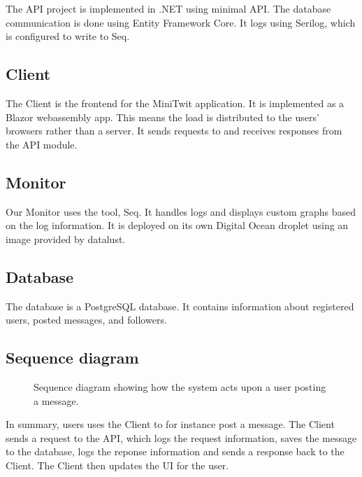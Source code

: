 The API project is implemented in .NET using minimal API.
The database communication is done using Entity Framework Core.
It logs using Serilog\cite{serilog}, 
which is configured to write to Seq\cite{seq}.

\subsection{Client}

The Client is the frontend for the MiniTwit application.
It is implemented as a Blazor webassembly app.
This means the load is distributed to the users' browsers 
rather than a server.
It sends requests to and receives responses from the API module.

\subsection{Monitor}

Our Monitor uses the tool, Seq\cite{seq}.
It handles logs and displays custom graphs based on 
the log information. 
It is deployed on its own Digital Ocean droplet 
using an image provided by datalust\cite{seq}.

\subsection{Database}

The database is a PostgreSQL\cite{postgres} database.
It contains information about registered users,
posted messages, and followers.

\subsection{Sequence diagram}

\begin{figure}[H]
    \centering
    
    \caption{Sequence diagram showing how the system acts upon 
    a user posting a message.}
    \label{fig:seq_diagram}
\end{figure}

In summary, users uses the Client to for instance post a message.
The Client sends a request to the API, which logs the request 
information, saves the message to the database, 
logs the reponse information and sends a response back to the 
Client. The Client then updates the UI for the user.
